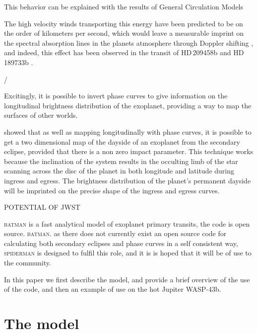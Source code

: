 \documentclass[a4paper,fleqn,usenatbib]{mnras}
\begin{document}
This behavior can be explained with the results of General Circulation Models \citep{Komacek2015,Komacek2016}

The high velocity winds transporting this energy have been predicted to be on the order of kilometers per second, which would leave a measurable imprint on the spectral absorption lines in the planets atmosphere through Doppler shifting \citep[e.g.][]{Showman2013}, and indeed, this effect has been observed in the transit of HD\,209458b \citep{Snellen2010} and HD\,189733b \citep{Louden2015}. 

/%

Excitingly, it is possible to invert phase curves to give information on the longitudinal brightness distribution of the exoplanet, providing a way to map the surfaces of other worlds. 

\cite{Majeau2012} showed that as well as mapping longitudinally with phase curves, it is possible to get a two dimensional map of the dayside of an exoplanet from the secondary eclipse, provided that there is a non zero impact parameter. This technique works because the inclination of the system results in the occulting limb of the star scanning across the disc of the planet in both longitude and latitude during ingress and egress. The brightness distribution of the planet's permanent dayside will be imprinted on the precise shape of the ingress and egress curves.

POTENTIAL OF JWST

\textsc{batman} \citep{Kreidberg2015a} is a fast analytical model of exoplanet primary transits, the code is open source. \textsc{batman}. as there does not currently exist an open source code for calculating both secondary eclipses and phase curves in a self consistent way, \textsc{spiderman} is designed to fulfil this role, and it is is hoped that it will be of use to the community.

In this paper we first describe the model, and provide a brief overview of the use of the code, and then an example of use on the hot Jupiter WASP-43b.

\section{The model}\label{sec:the model}
\end{document}
